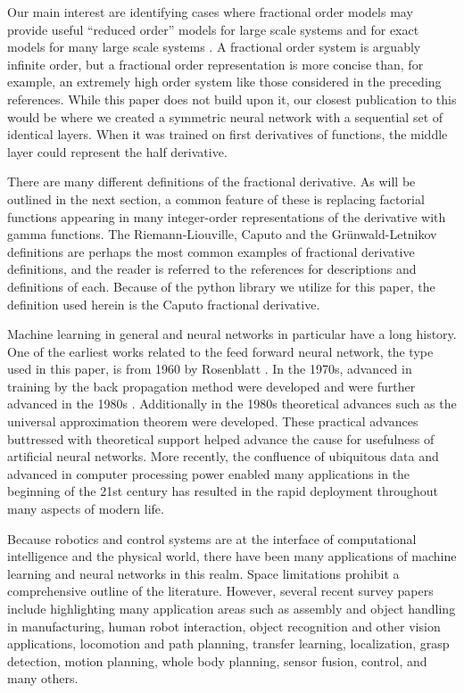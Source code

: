   Our main interest are identifying cases where fractional order models may
  provide useful ``reduced order'' models for large scale systems
  \cite{goodwinemed2023,goodwinemmar2023} and for exact models for many large
  scale systems
  \cite{Goodwine2014Modeling,Leyden2016Using,Leyden2019Large,bg:xnids2022,bg:xninonlinear2020}.
  A fractional order system is arguably infinite order, but a fractional order
  representation is more concise than, for example, an extremely high order
  system like those considered in the preceding references.  While this paper
  does not build upon it, our closest publication to this would be
  \cite{bg:chenSII2022} where we created a symmetric neural network with a
  sequential set of identical layers. When it was trained on first derivatives
  of functions, the middle layer could represent the half derivative. 
 
 There are many different definitions of the fractional derivative. As will be
 outlined in the next section, a common feature of these is replacing factorial
 functions appearing in many integer-order representations of the derivative
 with gamma functions. The Riemann-Liouville, Caputo and the Gr\"unwald-Letnikov
 definitions are perhaps the most common examples of fractional derivative
 definitions, and the reader is referred to the references
 \cite{Machado20111140,4609961,series/lnee/Ortigueira11,das2011functional} for
 descriptions and definitions of each. Because of the python library we utilize
 for this paper, the definition used herein is the Caputo fractional derivative. 

 Machine learning in general and neural networks in particular have a long
 history. One of the earliest works related to the feed forward neural network,
 the type used in this paper, is from 1960 by Rosenblatt \cite{Rosenblatt1960}.
 In the 1970s, advanced in training by the back propagation method were
 developed \cite{linnainmaa1} and were further advanced in the 1980s
 \cite{werbos}.  Additionally in the 1980s theoretical advances such as the
 universal approximation theorem \cite{hornik1989multilayer} were developed.
 These practical advances buttressed with theoretical support helped advance the
 cause for usefulness of artificial neural networks. More recently, the
 confluence of ubiquitous data and advanced in computer processing power enabled
 many applications in the beginning of the 21st century has resulted in the
 rapid deployment throughout many aspects of modern life. 

 Because robotics and control systems are at the interface of computational
 intelligence and the physical world, there have been many applications of
 machine learning and neural networks in this realm. Space limitations prohibit
 a comprehensive outline of the literature. However, several recent survey
 papers include \cite{semeraro,9199280,bai} highlighting many application areas
 such as assembly and object handling in manufacturing, human robot interaction,
 object recognition and other vision applications, locomotion and path planning,
 transfer learning, localization, grasp detection, motion planning, whole body
 planning, sensor fusion, control, and many others.

